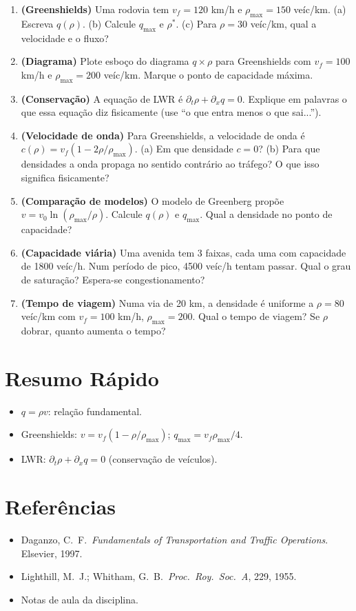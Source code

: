 \documentclass[12pt,a4paper]{article}
\begin{document}
\begin{enumerate}
  \item \textbf{(Greenshields)} Uma rodovia tem $v_f=120$ km/h e $\rho_\text{max}=150$ ve\'ic/km. (a) Escreva $q(\rho)$. (b) Calcule $q_\text{max}$ e $\rho^*$. (c) Para $\rho=30$ ve\'ic/km, qual a velocidade e o fluxo?
  
  \item \textbf{(Diagrama)} Plote esboço do diagrama $q \times \rho$ para Greenshields com $v_f=100$ km/h e $\rho_\text{max}=200$ ve\'ic/km. Marque o ponto de capacidade m\'axima.
  
  \item \textbf{(Conserva\c{c}\~ao)} A equa\c{c}\~ao de LWR \'e $\partial_t\rho + \partial_x q = 0$. Explique em palavras o que essa equa\c{c}\~ao diz fisicamente (use ``o que entra menos o que sai...'').
  
  \item \textbf{(Velocidade de onda)} Para Greenshields, a velocidade de onda \'e $c(\rho) = v_f(1-2\rho/\rho_\text{max})$. (a) Em que densidade $c=0$? (b) Para que densidades a onda propaga no sentido contr\'ario ao tr\'afego? O que isso significa fisicamente?
  
  \item \textbf{(Compara\c{c}\~ao de modelos)} O modelo de Greenberg prop\~oe $v = v_0\ln(\rho_\text{max}/\rho)$. Calcule $q(\rho)$ e $q_\text{max}$. Qual a densidade no ponto de capacidade?
  
  \item \textbf{(Capacidade vi\'aria)} Uma avenida tem 3 faixas, cada uma com capacidade de 1800 ve\'ic/h. Num per\'iodo de pico, 4500 ve\'ic/h tentam passar. Qual o grau de satura\c{c}\~ao? Espera-se congestionamento?
  
  \item \textbf{(Tempo de viagem)} Numa via de 20 km, a densidade \'e uniforme a $\rho = 80$ ve\'ic/km com $v_f=100$ km/h, $\rho_\text{max}=200$. Qual o tempo de viagem? Se $\rho$ dobrar, quanto aumenta o tempo?
\end{enumerate}

\section*{Resumo R\'apido}
\begin{itemize}
  \item $q = \rho v$: rela\c{c}\~ao fundamental.
  \item Greenshields: $v = v_f(1-\rho/\rho_\text{max})$; $q_\text{max} = v_f\rho_\text{max}/4$.
  \item LWR: $\partial_t\rho + \partial_x q = 0$ (conserva\c{c}\~ao de ve\'iculos).
\end{itemize}

\section*{Refer\^encias}
\begin{itemize}
  \item Daganzo, C.\ F.\ \textit{Fundamentals of Transportation and Traffic Operations}. Elsevier, 1997.
  \item Lighthill, M.\ J.; Whitham, G.\ B.\ \textit{Proc.\ Roy.\ Soc.\ A}, 229, 1955.
  \item Notas de aula da disciplina.
\end{itemize}
\end{document}
